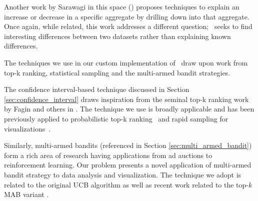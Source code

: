 Another work by Sarawagi in this space (\cite{DBLP:conf/vldb/Sarawagi99}) proposes techniques to explain an
increase or decrease in a specific aggregate by drilling down into that aggregate.
Once again, while related, this work addresses a different question; \SeeDB\ seeks to find interesting
differences between two datasets rather than explaining known differences. 






The techniques we use in our custom implementation of \SeeDB\ draw upon work
from top-k ranking, statistical sampling and the multi-armed bandit strategies. 

The confidence interval-based technique discussed in Section \ref{sec:confidence_interval} 
draws inspiration from the seminal top-k ranking work by Fagin and others in 
\cite{DBLP:conf/pods/FaginLN01, DBLP:conf/vldb/IlyasAE04}. The technique we use is broadly
applicable and has been previously applied to probabilistic top-k ranking~\cite{DBLP:conf/ICDE/ReDS07} 
and rapid sampling for visualizations~\cite{DBLP:journals/corr/KimBPIMR14}. 

Similarly, multi-armed bandits (referenced in Section \ref{sec:multi_armed_bandit}) form 
a rich area of research having applications from ad auctions to reinforcement learning. 
Our problem presents a novel application of multi-armed bandit strategy to data analysis 
and visualization.
The technique we adopt is related to the original UCB algorithm \cite{AuerCF02, LaiR85}
as well as recent work related to the top-$k$ MAB variant \cite{BubeckWV13,
audibert2010best}. 

